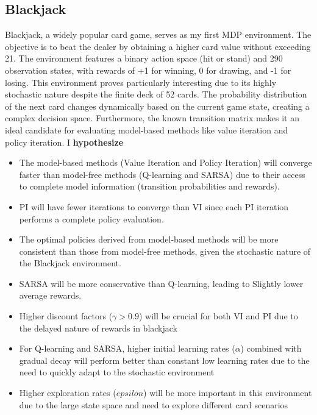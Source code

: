 \documentclass[conference]{IEEEtran}
\begin{document}
\subsection{Blackjack}
Blackjack, a widely popular card game, serves as my first MDP environment. The objective is to beat the dealer by obtaining a higher card value without exceeding 21. The environment features a binary action space (hit or stand) and 290 observation states, with rewards of +1 for winning, 0 for drawing, and -1 for losing. This environment proves particularly interesting due to its highly stochastic nature despite the finite deck of 52 cards. The probability distribution of the next card changes dynamically based on the current game state, creating a complex decision space. Furthermore, the known transition matrix makes it an ideal candidate for evaluating model-based methods like value iteration and policy iteration. I \textbf{hypothesize}
\begin{itemize}
    \item The model-based methods (Value Iteration and Policy Iteration) will converge faster than model-free methods (Q-learning and SARSA) due to their access to complete model information (transition probabilities and rewards).
    \item PI will have fewer iterations to converge than VI since each PI iteration performs a complete policy evaluation.
    \item The optimal policies derived from model-based methods will be more consistent than those from model-free methods, given the stochastic nature of the Blackjack environment.
    \item SARSA will be more conservative than Q-learning, leading to Slightly lower average rewards. 
    \item Higher discount factors ($\gamma> 0.9$) will be crucial for both VI and PI due to the delayed nature of rewards in blackjack
    \item For Q-learning and SARSA, higher initial learning rates ($\alpha$) combined with gradual decay will perform better than constant low learning rates due to the need to quickly adapt to the stochastic environment
    \item Higher exploration rates ($epsilon$) will be more important in this environment due to the large state space and need to explore different card scenarios
\end{itemize} 
\end{document}
